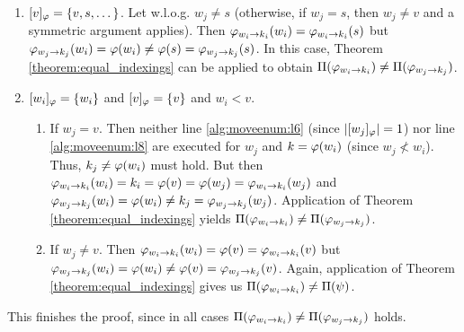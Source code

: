 \begin{\appendixproof}
\begin{enumerate}
\begin{enumerate}
\begin{enumerate}
\begin{enumerate}
                    \item If $w_j \neq u$: then $\move{\idx}{w_j}{k_j}(w_i) = \idx(w_i) = \idx(u) = \move{\idx}{w_j}{k_j}(u)$ and $\move{\idx}{w_i}{k_i}(w_i) \neq \idx(w_i) = \idx(u) = \move{\idx}{w_i}{k_i}(u)$. Theorem \ref{theorem:equal_indexings} can be applied with result $\Pi(\move{\idx}{w_i}{k_i}) \neq \Pi(\move{\idx}{w_j}{k_j})$.
                \end{enumerate}
                \item $[v]_{\varphi} = \{v,s,\dots\}$. Let w.l.o.g. $w_j \neq s$ (otherwise, if $w_j = s$, then $w_j \neq v$ and a symmetric argument applies). Then $\varphi_{w_i\rightarrow k_i}(w_i) = \varphi_{w_i\rightarrow k_i}(s)$ but $\varphi_{w_j\rightarrow k_j}(w_i) = \varphi(w_i) \neq  \varphi(s) = \varphi_{w_j\rightarrow k_j}(s)$. In this case, Theorem \ref{theorem:equal_indexings} can be applied to obtain $\Pi(\move{\idx}{w_i}{k_i}) \neq \Pi(\move{\idx}{w_j}{k_j})$.
                \item $[w_i]_\varphi = \{ w_i \}$ and $[v]_\varphi = \{ v \}$ and $w_i < v$.
                \begin{enumerate}
                    \item If $w_j = v$. Then neither line \ref{alg:moveenum:l6} (since $|[w_j]_\varphi| = 1$) nor line \ref{alg:moveenum:l8} are executed for $w_j$ and $k = \varphi(w_i)$ (since $w_j \not < w_i$). Thus, $k_j \neq \varphi(w_i)$ must hold. But then $\varphi_{w_i\rightarrow k_i}(w_i) = k_i = \varphi(v) = \varphi(w_j) = \varphi_{w_i\rightarrow k_i}(w_j)$ and $\varphi_{w_j\rightarrow k_j}(w_i) = \varphi(w_i) \neq k_j = \varphi_{w_j\rightarrow k_j}(w_j)$. Application of Theorem \ref{theorem:equal_indexings} yields $\Pi(\move{\idx}{w_i}{k_i}) \neq \Pi(\move{\idx}{w_j}{k_j})$.
                    \item If $w_j \neq v$. Then $\varphi_{w_i\rightarrow k_i}(w_i) = \varphi(v) = \varphi_{w_i\rightarrow k_i}(v)$ but $\varphi_{w_j\rightarrow k_j}(w_i) = \varphi(w_i) \neq \varphi(v) = \varphi_{w_j\rightarrow k_j}(v)$. Again, application of Theorem \ref{theorem:equal_indexings} gives us $\Pi(\varphi_{w_i\rightarrow k_i}) \neq \Pi(\psi)$.
                \end{enumerate} 
            \end{enumerate}
        \end{enumerate}
    \end{enumerate}
    This finishes the proof, since in all cases $\Pi(\move{\idx}{w_i}{k_i}) \neq \Pi(\move{\idx}{w_j}{k_j})$ holds.
\end{\appendixproof}


